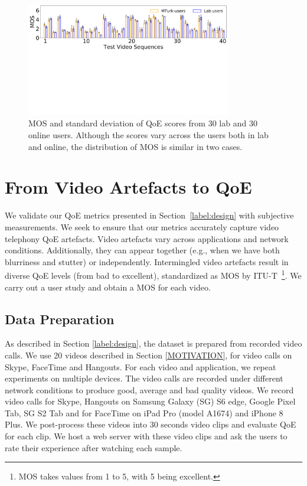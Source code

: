 \begin{figure}[t]
  \centering
  \includegraphics[width=0.8\textwidth]{sections/network-work/mos}
  \vspace{-1.8in}
  \caption{MOS and standard deviation of QoE scores from 30 lab and 30 online users. Although the scores vary across the users both in lab and online, the distribution of MOS is similar in two cases.}
  \vspace{-0.12in}
  \label{fig:mos}
\end{figure}

\section{From Video Artefacts to Q\lowercase{o}E} \label{label:results}
We validate our QoE metrics presented in Section~\ref{label:design} with subjective measurements. We seek to ensure that our metrics accurately capture  video telephony QoE artefacts. Video artefacts vary across applications and network conditions. Additionally, they can appear together (e.g., when we have both blurriness and stutter) or independently. Intermingled video artefacts result in diverse QoE levels (from bad to excellent), standardized as MOS by ITU-T~\cite{series2012methodology}\footnote{MOS takes values from 1 to 5, with 5 being excellent.}. We carry out a user study and obtain a MOS for each video.

\subsection{Data Preparation}
As described in Section \ref{label:design}, the dataset is prepared from recorded video calls. We use 20 videos described in Section \ref{MOTIVATION}, for video calls on Skype, FaceTime and Hangouts. For each video and application, we repeat  experiments on  multiple devices. The video calls are recorded under different network conditions to produce good, average and bad quality videos. We record video calls for Skype, Hangouts on Samsung Galaxy (SG) S6 edge, Google Pixel Tab, SG S2 Tab and for FaceTime on iPad Pro (model A1674) and iPhone 8 Plus. We post-process these videos into 30 seconds  video clips and evaluate QoE for each clip. We host a web server with these video clips and ask the users to rate their experience after watching each sample. 


